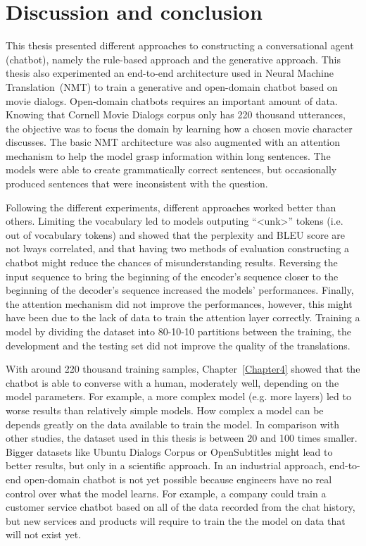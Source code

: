 
\chapter{Discussion and conclusion} %

\label{Chapter5} %

This thesis presented different approaches to constructing a conversational agent (chatbot), namely the rule-based approach and the generative approach. This thesis also experimented an end-to-end architecture used in Neural Machine Translation~(NMT) to train a generative and open-domain chatbot based on movie dialogs.
Open-domain chatbots requires an important amount of data. Knowing that Cornell Movie Dialogs corpus only has 220 thousand utterances, the objective was to focus the domain by learning how a chosen movie character discusses.
The basic NMT architecture was also augmented with an attention mechanism to help the model grasp information within long sentences.
The models were able to create grammatically correct sentences, but occasionally produced sentences that were inconsistent with the question.

Following the different experiments, different approaches worked better than others.
Limiting the vocabulary led to models outputing ``<unk>'' tokens (i.e. out of vocabulary tokens) and showed that the perplexity and BLEU score are not lways correlated, and that having two methods of evaluation constructing a chatbot might reduce the chances of misunderstanding results.
Reversing the input sequence to bring the beginning of the encoder's sequence closer to the beginning of the decoder's sequence increased the models' performances.
Finally, the attention mechanism did not improve the performances, however, this might have been due to the lack of data to train the attention layer correctly.
Training a model by dividing the dataset into 80-10-10 partitions between the training, the development and the testing set did not improve the quality of the translations.

With around 220 thousand training samples, Chapter~\ref{Chapter4} showed that the chatbot is able to converse with a human, moderately well, depending on the model parameters. For example, a more complex model (e.g. more layers) led to worse results than relatively simple models.
How complex a model can be depends greatly on the data available to train the model. In comparison with other studies, the dataset used in this thesis is between \num{20} \citep{DBLP:journals/corr/LowePSP15} and \num{100} \citep{1506.05869} times smaller.
Bigger datasets like Ubuntu Dialogs Corpus \citep{DBLP:journals/corr/LowePSP15} or OpenSubtitles \citep{open-subtitle} might lead to better results, but only in a scientific approach.
In an industrial approach, end-to-end open-domain chatbot is not yet possible because engineers have no real control over what the model learns.
For example, a company could train a customer service chatbot based on all of the data recorded from the chat history, but new services and products will require to train the the model on data that will not exist yet.

